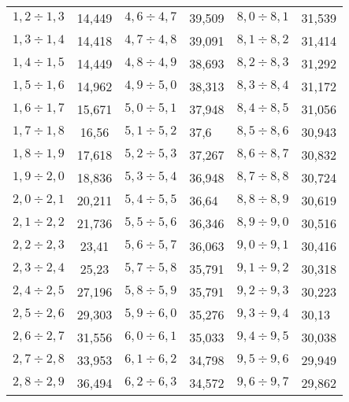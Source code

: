 \begin{table}
\begin{center}
\begin{tabular}{||c|c||c|l||c|l||}
$   1{,}2 \div    1{,}3 $ & 14{,}449  & $ 4{,}6 \div    4{,}7 $ & 39{,}509  & $ 8{,}0 \div    8{,}1 $ & 31{,}539  \\
$   1{,}3 \div    1{,}4 $ & 14{,}418  & $ 4{,}7 \div    4{,}8 $ & 39{,}091  & $ 8{,}1 \div    8{,}2 $ & 31{,}414  \\
$   1{,}4 \div    1{,}5 $ & 14{,}449  & $ 4{,}8 \div    4{,}9 $ & 38{,}693  & $ 8{,}2 \div    8{,}3 $ & 31{,}292  \\
$   1{,}5 \div    1{,}6 $ & 14{,}962  & $ 4{,}9 \div    5{,}0 $ & 38{,}313  & $ 8{,}3 \div    8{,}4 $ & 31{,}172  \\
$   1{,}6 \div    1{,}7 $ & 15{,}671  & $ 5{,}0 \div    5{,}1 $ & 37{,}948  & $ 8{,}4 \div    8{,}5 $ & 31{,}056  \\
$   1{,}7 \div    1{,}8 $ & 16{,}56\hphantom{9}   & $ 5{,}1 \div    5{,}2 $ & 37{,}6    & $ 8{,}5 \div    8{,}6 $ & 30{,}943  \\
$   1{,}8 \div    1{,}9 $ & 17{,}618  & $ 5{,}2 \div    5{,}3 $ & 37{,}267  & $ 8{,}6 \div    8{,}7 $ & 30{,}832  \\
$   1{,}9 \div    2{,}0 $ & 18{,}836  & $ 5{,}3 \div    5{,}4 $ & 36{,}948  & $ 8{,}7 \div    8{,}8 $ & 30{,}724  \\
$   2{,}0 \div    2{,}1 $ & 20{,}211  & $ 5{,}4 \div    5{,}5 $ & 36{,}64   & $ 8{,}8 \div    8{,}9 $ & 30{,}619  \\
$   2{,}1 \div    2{,}2 $ & 21{,}736  & $ 5{,}5 \div    5{,}6 $ & 36{,}346  & $ 8{,}9 \div    9{,}0$ & 30{,}516  \\
$   2{,}2 \div    2{,}3 $ & 23{,}41\hphantom{9}   & $ 5{,}6 \div    5{,}7 $ & 36{,}063  & $ 9{,0} \div    9{,}1 $ & 30{,}416  \\
$   2{,}3 \div    2{,}4 $ & 25{,}23\hphantom{9}   & $ 5{,}7 \div    5{,}8 $ & 35{,}791  & $ 9{,}1 \div    9{,}2 $ & 30{,}318  \\
$   2{,}4 \div    2{,}5 $ & 27{,}196  & $ 5{,}8 \div    5{,}9 $ & 35{,}791  & $ 9{,}2 \div    9{,}3 $ & 30{,}223  \\
$   2{,}5 \div    2{,}6 $ & 29{,}303  & $ 5{,}9 \div    6{,}0 $ & 35{,}276  & $ 9{,}3 \div    9{,}4 $ & 30{,}13   \\
$   2{,}6 \div    2{,}7 $ & 31{,}556  & $ 6{,}0 \div    6{,}1 $ & 35{,}033  & $ 9{,}4 \div    9{,}5 $ & 30{,}038  \\
$   2{,}7 \div    2{,}8 $ & 33{,}953  & $ 6{,}1 \div    6{,}2 $ & 34{,}798  & $ 9{,}5 \div    9{,}6 $ & 29{,}949  \\
$   2{,}8 \div    2{,}9 $ & 36{,}494  & $ 6{,}2 \div    6{,}3 $ & 34{,}572  & $ 9{,}6 \div    9{,}7 $ & 29{,}862  \\

\end{tabular}
\end{center}
\end{table}
